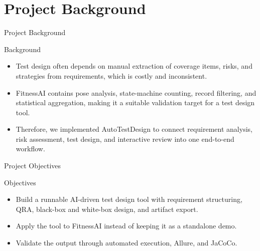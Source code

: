 %
%
%
%
\section{Project Background}

\begin{frame}{Project Background}
    \small
    \begin{block}{Background}
        \begin{itemize}
            \item Test design often depends on manual extraction of coverage items, risks, and strategies from requirements, which is costly and inconsistent.
            \item FitnessAI contains pose analysis, state-machine counting, record filtering, and statistical aggregation, making it a suitable validation target for a test design tool.
            \item Therefore, we implemented AutoTestDesign to connect requirement analysis, risk assessment, test design, and interactive review into one end-to-end workflow.
        \end{itemize}
    \end{block}
\end{frame}

\begin{frame}{Project Objectives}
    \small
    \begin{block}{Objectives}
        \begin{itemize}
            \item Build a runnable AI-driven test design tool with requirement structuring, QRA, black-box and white-box design, and artifact export.
            \item Apply the tool to FitnessAI instead of keeping it as a standalone demo.
            \item Validate the output through automated execution, Allure, and JaCoCo.
        \end{itemize}
    \end{block}
\end{frame}

